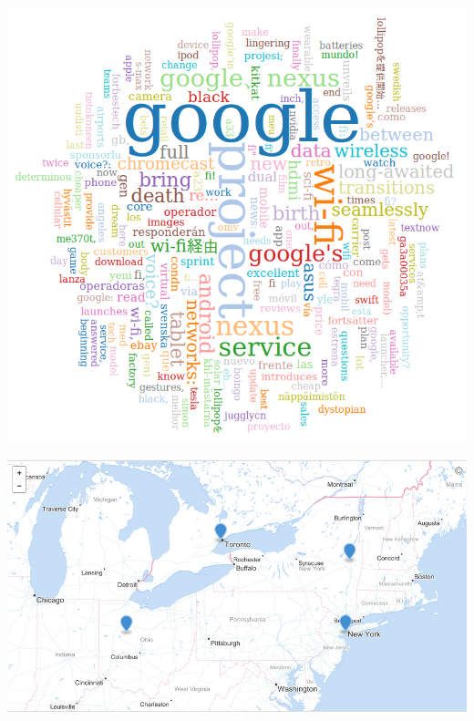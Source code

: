 	\begin{minipage}{\linewidth}
		\centering
			\includegraphics[scale=0.55]{figures/q4/wordCloudDay5}
		\label{wordCount}
	\end{minipage}	
	
	\begin{minipage}{\linewidth}
		\centering
			\includegraphics[scale=0.55]{figures/q4/geojsonDay1}
		\label{wordCount}
	\end{minipage}

